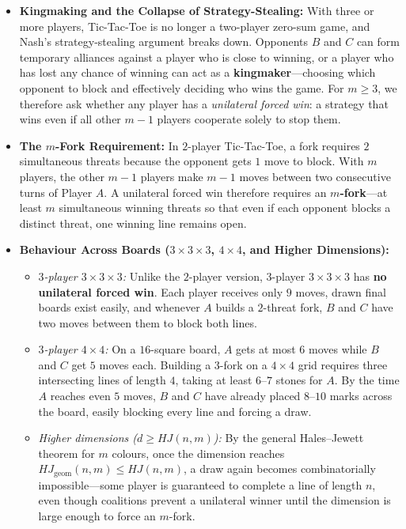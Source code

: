 \documentclass[11pt, a4paper]{article}
\begin{document}
\begin{itemize}
    \item \textbf{Kingmaking and the Collapse of Strategy-Stealing:} With three or more players, Tic-Tac-Toe is no longer a two-player zero-sum game, and Nash's strategy-stealing argument breaks down. Opponents $B$ and $C$ can form temporary alliances against a player who is close to winning, or a player who has lost any chance of winning can act as a \textbf{kingmaker}—choosing which opponent to block and effectively deciding who wins the game. For $m \ge 3$, we therefore ask whether any player has a \emph{unilateral forced win}: a strategy that wins even if all other $m - 1$ players cooperate solely to stop them.

    \item \textbf{The $m$-Fork Requirement:} In $2$-player Tic-Tac-Toe, a fork requires $2$ simultaneous threats because the opponent gets $1$ move to block. With $m$ players, the other $m - 1$ players make $m - 1$ moves between two consecutive turns of Player $A$. A unilateral forced win therefore requires an \textbf{$m$-fork}—at least $m$ simultaneous winning threats so that even if each opponent blocks a distinct threat, one winning line remains open.

    \item \textbf{Behaviour Across Boards ($3 \times 3 \times 3$, $4 \times 4$, and Higher Dimensions):}
    \begin{itemize}
        \item \emph{$3$-player $3 \times 3 \times 3$:} Unlike the $2$-player version, $3$-player $3 \times 3 \times 3$ has \textbf{no unilateral forced win}. Each player receives only $9$ moves, drawn final boards exist easily, and whenever $A$ builds a $2$-threat fork, $B$ and $C$ have two moves between them to block both lines.
        \item \emph{$3$-player $4 \times 4$:} On a $16$-square board, $A$ gets at most $6$ moves while $B$ and $C$ get $5$ moves each. Building a $3$-fork on a $4 \times 4$ grid requires three intersecting lines of length $4$, taking at least $6$--$7$ stones for $A$. By the time $A$ reaches even $5$ moves, $B$ and $C$ have already placed $8$--$10$ marks across the board, easily blocking every line and forcing a draw.
        \item \emph{Higher dimensions ($d \ge HJ(n, m)$):} By the general Hales--Jewett theorem for $m$ colours, once the dimension reaches $HJ_{\mathrm{geom}}(n, m) \le HJ(n, m)$, a draw again becomes combinatorially impossible—some player is guaranteed to complete a line of length $n$, even though coalitions prevent a unilateral winner until the dimension is large enough to force an $m$-fork.
    \end{itemize}
\end{itemize}
\end{document}
